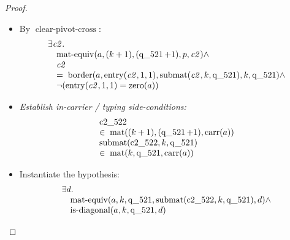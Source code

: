 \documentclass[11pt]{article}
\theoremstyle{plain}
\begin{document}
\begin{proof}
\begin{itemize}[leftmargin=2.8em, itemsep=4pt, parsep=1pt]
  \item[\textbf{76}] By $\operatorname{clear\text{-}pivot\text{-}cross}$:
\begin{equation*}
\begin{array}{@{}l@{}} \exists \mathit{c2}. \\ \quad \operatorname{mat\text{-}equiv}(a, (k + 1), (\operatorname{q\_521} + 1), p, \mathit{c2}) \wedge \\ \quad \mathit{c2} \\ \quad =\; \operatorname{border}(a, \operatorname{entry}(\mathit{c2}, 1, 1), \operatorname{submat}(\mathit{c2}, k, \operatorname{q\_521}), k, \operatorname{q\_521}) \wedge \\ \quad \neg (\operatorname{entry}(\mathit{c2}, 1, 1) = \operatorname{zero}(a)) \end{array}
\end{equation*}

  \item[\textbf{77--81}] \emph{Establish in-carrier / typing side-conditions:}
\begin{equation*}
\begin{array}{@{}l@{}}
\begin{array}{@{}l@{}} \operatorname{c2\_522} \\ \in\; \operatorname{mat}((k + 1), (\operatorname{q\_521} + 1), \operatorname{carr}(a)) \end{array} \\
\begin{array}{@{}l@{}} \operatorname{submat}(\operatorname{c2\_522}, k, \operatorname{q\_521}) \\ \in\; \operatorname{mat}(k, \operatorname{q\_521}, \operatorname{carr}(a)) \end{array}
\end{array}
\end{equation*}

  \item[\textbf{82--83}] Instantiate the hypothesis:
\begin{equation*}
\begin{array}{@{}l@{}} \exists d. \\ \quad \operatorname{mat\text{-}equiv}(a, k, \operatorname{q\_521}, \operatorname{submat}(\operatorname{c2\_522}, k, \operatorname{q\_521}), d) \wedge \\ \quad \operatorname{is\text{-}diagonal}(a, k, \operatorname{q\_521}, d) \end{array}
\end{equation*}


\end{itemize}
\end{proof}
\end{document}
